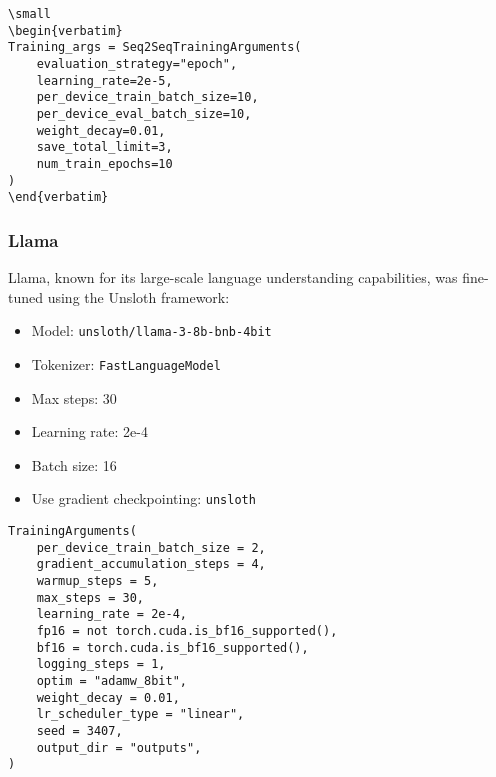 \documentclass[conference]{IEEEtran}
\begin{document}
\begin{tcolorbox}[linewidth=1pt, innerleftmargin=15pt, innerrightmargin=15pt, innertopmargin=15pt, innerbottommargin=15pt]
\begin{lstlisting}
\small
\begin{verbatim}
Training_args = Seq2SeqTrainingArguments(
    evaluation_strategy="epoch",
    learning_rate=2e-5,
    per_device_train_batch_size=10,
    per_device_eval_batch_size=10,
    weight_decay=0.01,
    save_total_limit=3,
    num_train_epochs=10
)
\end{verbatim}
\end{lstlisting}
\end{tcolorbox}

        \subsubsection{Llama}

            Llama, known for its large-scale language understanding capabilities, was fine-tuned using the Unsloth framework:
            \begin{itemize}
                \item Model: \texttt{unsloth/llama-3-8b-bnb-4bit}
                \item Tokenizer: \texttt{FastLanguageModel}
                \item Max steps: 30
                \item Learning rate: 2e-4
                \item Batch size: 16
                \item Use gradient checkpointing: \texttt{unsloth}
            \end{itemize}

\begin{tcolorbox}[linewidth=0.5pt, innerleftmargin=10pt, innerrightmargin=10pt, innertopmargin=10pt, innerbottommargin=10pt, fontupper=\footnotesize]
\begin{verbatim}
TrainingArguments(
    per_device_train_batch_size = 2,
    gradient_accumulation_steps = 4,
    warmup_steps = 5,
    max_steps = 30,
    learning_rate = 2e-4,
    fp16 = not torch.cuda.is_bf16_supported(),
    bf16 = torch.cuda.is_bf16_supported(),
    logging_steps = 1,
    optim = "adamw_8bit",
    weight_decay = 0.01,
    lr_scheduler_type = "linear",
    seed = 3407,
    output_dir = "outputs",
)
\end{verbatim}
\end{tcolorbox}
\end{document}
